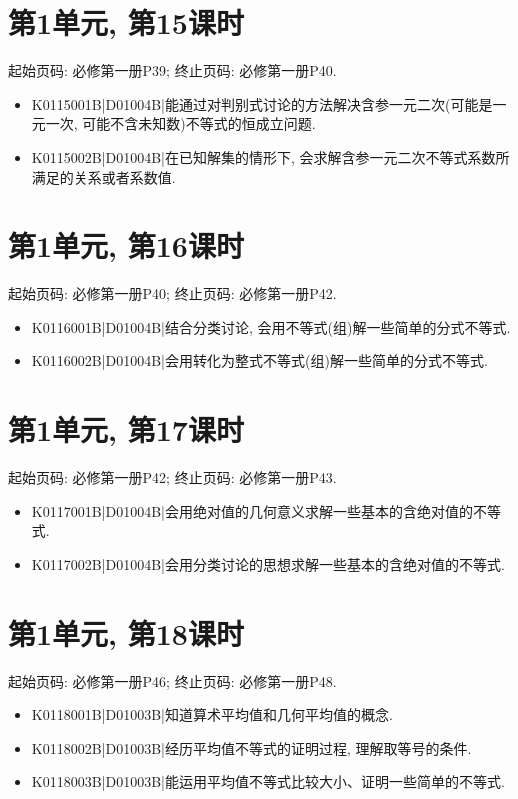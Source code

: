 \section*{第1单元, 第15课时}
起始页码: 必修第一册P39; 终止页码: 必修第一册P40.
\begin{itemize}
\item K0115001B|D01004B|能通过对判别式讨论的方法解决含参一元二次(可能是一元一次, 可能不含未知数)不等式的恒成立问题.
\item K0115002B|D01004B|在已知解集的情形下, 会求解含参一元二次不等式系数所满足的关系或者系数值.
\end{itemize}

\section*{第1单元, 第16课时}
起始页码: 必修第一册P40; 终止页码: 必修第一册P42.
\begin{itemize}
\item K0116001B|D01004B|结合分类讨论, 会用不等式(组)解一些简单的分式不等式.
\item K0116002B|D01004B|会用转化为整式不等式(组)解一些简单的分式不等式.
\end{itemize}

\section*{第1单元, 第17课时}
起始页码: 必修第一册P42; 终止页码: 必修第一册P43.
\begin{itemize}
\item K0117001B|D01004B|会用绝对值的几何意义求解一些基本的含绝对值的不等式.
\item K0117002B|D01004B|会用分类讨论的思想求解一些基本的含绝对值的不等式.
\end{itemize}

\section*{第1单元, 第18课时}
起始页码: 必修第一册P46; 终止页码: 必修第一册P48.
\begin{itemize}
\item K0118001B|D01003B|知道算术平均值和几何平均值的概念.
\item K0118002B|D01003B|经历平均值不等式的证明过程, 理解取等号的条件.
\item K0118003B|D01003B|能运用平均值不等式比较大小、证明一些简单的不等式.
\end{itemize}

